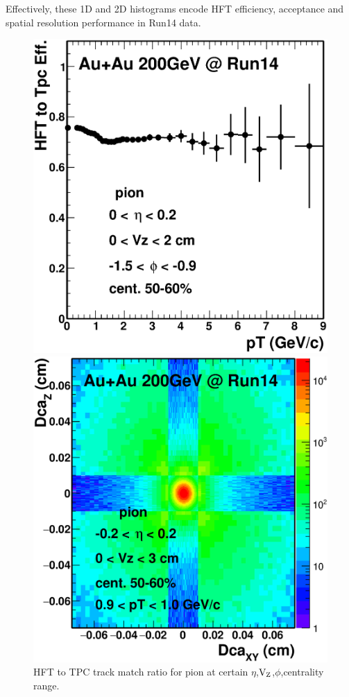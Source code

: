 Effectively, these 1D and 2D histograms encode HFT efficiency, acceptance and spatial resolution performance in Run14 data.

\begin{figure}[htbp]
\begin{minipage}[htbp]{0.52\linewidth}
\centering
\includegraphics[width=1.0\textwidth,angle=0]{figure/Run14_D0HFT/hftRatioExample.eps}
\caption{ HFT to TPC track match ratio for pion at certain $\eta$,$\textup{V}_{\textup{Z}}$,$\phi$,centrality range. \label{hftRatioExample}}
\end{minipage}
\hfill
\begin{minipage}[htbp]{0.52\linewidth}
\centering
\includegraphics[width=1.0\textwidth,angle=0]{figure/Run14_D0HFT/DcaExample.eps} 

\end{minipage}
\end{figure}
